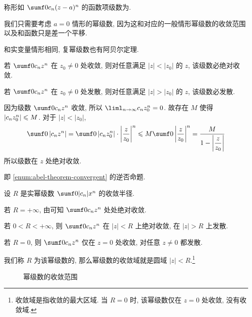 \begin{definition}
  称形如 $\sumf0 c_n(z-a)^n$ 的函数项级数为.\footnotemark
\end{definition}

我们只需要考虑 $a=0$ 情形的幂级数, 因为这和对应的一般情形幂级数的收敛范围以及和函数只是差一个平移.

和实变量情形相同, 复幂级数也有阿贝尔定理.

\begin{theorem}[阿贝尔定理]
  \label{thm:abel-first}
  \begin{enuma}
    \item 若 $\sumf0 c_nz^n$ 在 $z_0\neq 0$ 处收敛, 则对任意满足 $|z|<|z_0|$ 的 $z$, 该级数必绝对收敛.\label{enum:abel-theorem-convergent}
    \item 若 $\sumf0 c_nz^n$ 在 $z_0\neq 0$ 处发散, 则对任意满足 $|z|>|z_0|$ 的 $z$, 该级数必发散.
  \end{enuma}
\end{theorem}

\begin{proofenuma}
  \item 因为级数 $\sumf0 c_nz^n$ 收敛, 所以 $\liml_{n\ra\infty}c_n z_0^n=0$.
  故存在 $M$ 使得 $\left|c_nz_0^n\right|\leqslant M$.
  对于 $|z|<|z_0|$,
  \[
      \sumf0 \abs{c_nz^n}
    =\sumf0 \abs{c_nz_0^n}\cdot\abs{\frac z{z_0}}^n
    \le M\sumf0 \abs{\frac z{z_0}}^n
    =\frac{M}{1-\abs{\dfrac z{z_0}}}
  \]
  所以级数在 $z$ 处绝对收敛.
  \item 即 \ref{enum:abel-theorem-convergent} 的逆否命题.\qedhere
\end{proofenuma}

设 $R$ 是实幂级数 $\sumf0 |c_n|x^n$ 的收敛半径.
\begin{enuma}
  \item 若 $R=+\infty$, 由\thmAF 可知 $\sumf0 c_nz^n$ 处处绝对收敛.
  \item 若 $0<R<+\infty$, 则 $\sumf0 c_nz^n$ 在 $|z|<R$ 上绝对收敛, 在 $|z|>R$ 上发散.
  \item 若 $R=0$, 则 $\sumf0 c_nz^n$ 仅在 $z=0$ 处收敛, 对任意 $z\neq 0$ 都发散.
\end{enuma}
我们称 $R$ 为该幂级数的, 那么\alert{幂级数的收敛域就是圆域 $|z|<R$}.\footnote{收敛域是指收敛的最大区域. 当 $R=0$ 时, 该幂级数仅在 $z=0$ 处收敛, 没有收敛域.}

\begin{figure}[!hbt]
  \centering
  \caption{幂级数的收敛范围}
\end{figure}

